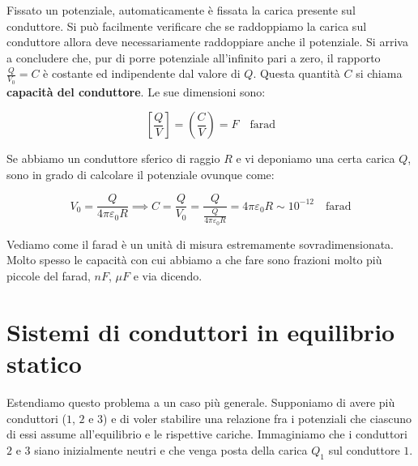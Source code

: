 Fissato un potenziale, automaticamente è fissata la carica presente sul conduttore. Si può facilmente verificare che se raddoppiamo la carica sul conduttore allora deve necessariamente raddoppiare anche il potenziale.
Si arriva a concludere che, pur di porre potenziale all'infinito pari a zero, il rapporto $ \frac{Q}{V_0} = C $ è costante ed indipendente dal valore di $Q$. Questa quantità $C$ si chiama \textbf{capacità del conduttore}. Le sue dimensioni sono:

\[
	\left[ \frac{Q}{V} \right] = \left( \frac{C}{V} \right) = F \quad \text{farad}
\]

Se abbiamo un conduttore sferico di raggio $R$ e vi deponiamo una certa carica $Q$, sono in grado di calcolare il potenziale ovunque come:

\[
	V_0 = \frac{Q}{4\pi \varepsilon_0 R} \implies C = \frac{Q}{V_0} = \frac{Q}{\frac{Q}{4\pi \varepsilon_0 R}} = 4\pi \varepsilon_0 R \sim 10^{-12} \quad \text{farad}
\]

Vediamo come il farad è un unità di misura estremamente sovradimensionata. Molto spesso le capacità con cui abbiamo a che fare sono frazioni molto più piccole del farad, $nF$, $\mu F$ e via dicendo.

\section{Sistemi di conduttori in equilibrio statico}

Estendiamo questo problema a un caso più generale. Supponiamo di avere più conduttori ($1$, $2$ e $3$) e di voler stabilire una relazione fra i potenziali che ciascuno di essi assume all'equilibrio e le rispettive cariche. Immaginiamo che i conduttori $2$ e $3$ siano inizialmente neutri e che venga posta della carica $ Q_1  $ sul conduttore $1$.

